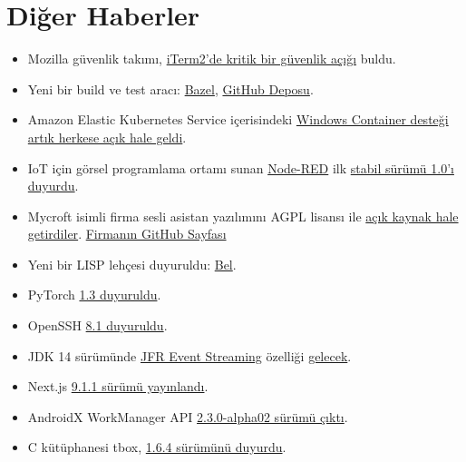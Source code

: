 \documentclass[11pt]{article}
\begin{document}
\section{Diğer Haberler}
\label{sec:org3838a2b}
\begin{itemize}
\item Mozilla güvenlik takımı, \href{https://blog.mozilla.org/security/2019/10/09/iterm2-critical-issue-moss-audit/}{iTerm2'de kritik bir güvenlik açığı} buldu.
\item Yeni bir build ve test aracı: \href{https://bazel.build/}{Bazel}, \href{https://github.com/bazelbuild/bazel}{GitHub Deposu}.
\item Amazon Elastic Kubernetes Service içerisindeki \href{https://aws.amazon.com/tr/blogs/aws/amazon-eks-windows-container-support-now-generally-available/}{Windows Container desteği
artık herkese açık hale geldi}.
\item IoT için görsel programlama ortamı sunan \href{https://nodered.org/}{Node-RED} ilk \href{https://www.infoq.com/news/2019/10/nodered-1-0-released/}{stabil sürümü 1.0'ı
duyurdu}.
\item Mycroft isimli firma sesli asistan yazılımını AGPL lisansı ile \href{https://mycroft.ai/blog/open-sourcing-the-mycroft-backend/}{açık kaynak
hale getirdiler}. \href{https://github.com/MycroftAI}{Firmanın GitHub Sayfası}
\item Yeni bir LISP lehçesi duyuruldu: \href{https://sep.yimg.com/ty/cdn/paulgraham/bellanguage.txt?t=1570888282}{Bel}.
\item PyTorch \href{https://ai.facebook.com/blog/pytorch-13-adds-mobile-privacy-quantization-and-named-tensors/}{1.3 duyuruldu}.
\item OpenSSH \href{http://www.openssh.com/txt/release-8.1}{8.1 duyuruldu}.
\item JDK 14 sürümünde \href{https://openjdk.java.net/jeps/349}{JFR Event Streaming} özelliği \href{https://mail.openjdk.java.net/pipermail/jdk-dev/2019-October/003377.html}{gelecek}.
\item Next.js \href{https://github.com/zeit/next.js/releases/tag/v9.1.1}{9.1.1 sürümü yayınlandı}.
\item AndroidX WorkManager API \href{https://developer.android.com/jetpack/androidx/releases/work\#2.3.0-alpha02}{2.3.0-alpha02 sürümü çıktı}.
\item C kütüphanesi tbox, \href{https://tboox.org/2019/10/11/update-v1.6.4/}{1.6.4 sürümünü duyurdu}.
\end{itemize}
\end{document}
